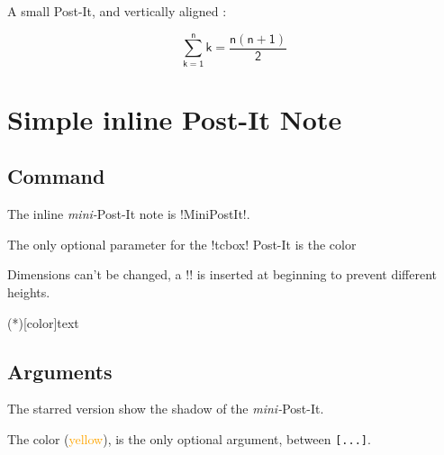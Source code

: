 \documentclass[english,a4paper,11pt]{article}
\newcommand\Cle[1]{{\small\sffamily\textlangle \textcolor{orange}{#1}\textrangle}}
\begin{document}
\begin{DemoCode}[]
\begin{wrapstuff}[r,top=1]
\begin{PostItNote}[Rotate=5,Render=tikzv2,Pin=Scotch,Color=pink]
\lipsum[1][1-2]
\end{PostItNote}
\end{wrapstuff}

\lipsum[1]
\end{DemoCode}

\begin{DemoCode}[]
A small Post-It, and vertically aligned :
%
\hfill\begin{PostItNote}[Rotate=-10,Color=orange,Width=5cm,Height=5cm, AlignV=center,Corner,PinColor=yellow, PinShift=-1,AlignPostIt=center]

\textsf{\small\lipsum[1][1-2]}
\[\mathsf{\displaystyle\sum_{k=1}^{n} k = \dfrac{n(n+1)}{2}}\]
\end{PostItNote}
\end{DemoCode}

\pagebreak

\section{Simple inline Post-It Note}

\subsection{Command}

\begin{cautionblock}
The inline \textit{mini-}Post-It note is \motcletex!MiniPostIt!.

The only optional parameter for the \motcletex!tcbox! Post-It is the color

\smallskip

Dimensions can't be changed, a \motcletex!\vphantom! is inserted at beginning to prevent different heights.
\end{cautionblock}

\begin{DemoCode}
\MiniPostIt(*)[color]{text}
\end{DemoCode}

\subsection{Arguments}

\begin{noteblock}
The starred version show the shadow of the \textit{mini-}Post-It.

The color (\Cle{yellow}), is the only optional argument, between \texttt{[...]}.
\end{noteblock}
\end{document}
